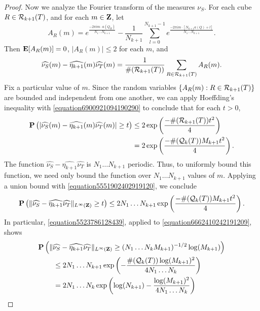 \begin{proof}
    Now we analyze the Fourier transform of the measures $\nu_S$. For each cube $R \in \operatorname{\mathcal{R}}_{k+1}(T)$, and for each $m \in \operatorname{\mathbf{Z}}$, let
    \[ A_R(m) = e^{\frac{-2 \pi i m \cdot a(Q_R)}{N_1 \dots N_{k+1}}} - \frac{1}{N_{k+1}} \sum_{l = 0}^{N_{k+1} - 1} e^{\frac{-2 \pi i m \cdot [N_{k+1} a(Q) + l]}{N_1 \dots N_{k+1}}}. \]
    Then $\operatorname{\mathbf{E}}[A_R(m)] = 0$, $|A_R(m)| \leq 2$ for each $m$, and
    \[ \widehat{\nu_S}(m) - \widehat{\eta_{k+1}}(m) \widehat{\nu_T}(m) = \frac{1}{\#(\operatorname{\mathcal{R}}_{k+1}(T))} \sum_{R \in \operatorname{\mathcal{R}}_{k+1}(T)} A_R(m). \]
    Fix a particular value of $m$. Since the random variables $\{ A_R(m) : R \in \operatorname{\mathcal{R}}_{k+1}(T) \}$ are bounded and independent from one another, we can apply Hoeffding's inequality with \eqref{equation6900921094190290} to conclude that for each $t > 0$,
    \begin{equation} \label{equation5551902402919120}
    \begin{split}
        \operatorname{\mathbf{P}} \left( |\widehat{\nu_S}(m) - \widehat{\eta_{k+1}}(m) \widehat{\nu_T}(m)| \geq t \right) &\leq 2 \exp \left( \frac{- \#(\operatorname{\mathcal{R}}_{k+1}(T)) t^2}{4} \right)\\
        &= 2 \exp \left( \frac{- \#(\operatorname{\mathcal{Q}}_k(T)) M_{k+1} t^2}{4} \right).
    \end{split}
    \end{equation}
    The function $\widehat{\nu_S} - \widehat{\eta_{k+1}} \widehat{\nu_T}$ is $N_1 \dots N_{k+1}$ periodic. Thus, to uniformly bound this function, we need only bound the function over $N_1 \dots N_{k+1}$ values of $m$. Applying a union bound with \eqref{equation5551902402919120}, we conclude
    \begin{equation} \label{equation6662410242191209}
        \operatorname{\mathbf{P}} \left( \| \widehat{\nu_S} - \widehat{\eta_{k+1}} \widehat{\nu_T} \|_{L^\infty(\operatorname{\mathbf{Z}})} \geq t \right) \leq 2 N_1 \dots N_{k+1} \exp \left( \frac{- \#(\operatorname{\mathcal{Q}}_k(T)) M_{k+1} t^2}{4} \right).
    \end{equation}
    In particular, \eqref{equation5523786128439}, applied to \eqref{equation6662410242191209}, shows
    \begin{align*}
        \PP & \left( \| \widehat{\nu_S} - \widehat{\eta_{k+1}} \widehat{\nu_T} \|_{L^\infty(\ZZ)} \geq (N_1 \dots N_k M_{k+1})^{-1/2} \log(M_{k+1}) \right)\\
        &\ \ \ \ \leq 2N_1 \dots N_{k+1} \exp \left( - \frac{\#(\DQ_k(T)) \log(M_{k+1})^2}{4 N_1 \dots N_k} \right)\\
        &\ \ \ \ = 2 N_1 \dots N_k \exp \left( \log(N_{k+1}) - \frac{\log(M_{k+1})^2}{4 N_1 \dots N_k} \right)\\

\end{align*}
\end{proof}
